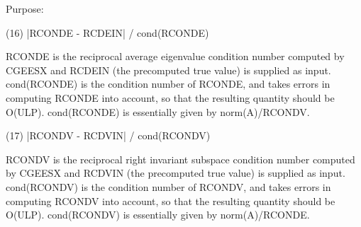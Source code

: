 \begin{DoxyParagraph}{Purpose\+: }
\begin{DoxyVerb}
   (16)  |RCONDE - RCDEIN| / cond(RCONDE)

      RCONDE is the reciprocal average eigenvalue condition number
      computed by CGEESX and RCDEIN (the precomputed true value)
      is supplied as input.  cond(RCONDE) is the condition number
      of RCONDE, and takes errors in computing RCONDE into account,
      so that the resulting quantity should be O(ULP). cond(RCONDE)
      is essentially given by norm(A)/RCONDV.

   (17)  |RCONDV - RCDVIN| / cond(RCONDV)

      RCONDV is the reciprocal right invariant subspace condition
      number computed by CGEESX and RCDVIN (the precomputed true
      value) is supplied as input. cond(RCONDV) is the condition
      number of RCONDV, and takes errors in computing RCONDV into
      account, so that the resulting quantity should be O(ULP).
      cond(RCONDV) is essentially given by norm(A)/RCONDE.\end{DoxyVerb}
 
\end{DoxyParagraph}

